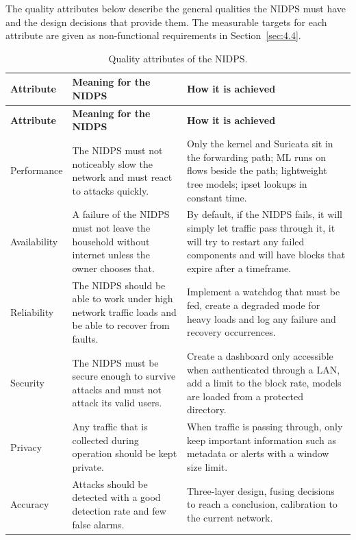 \noindent The quality attributes below describe the general qualities the NIDPS must have and the design decisions that provide them. The measurable targets for each attribute are given as non-functional requirements in Section~\ref{sec:4.4}.

{\small
\begin{longtable}{|>{\raggedright\arraybackslash}p{}|>{\raggedright\arraybackslash}p{}|>{\raggedright\arraybackslash}p{}|}
\caption{Quality attributes of the NIDPS.}\label{tab:4.2}\\
\hline
\textbf{Attribute} & \textbf{Meaning for the NIDPS} & \textbf{How it is achieved} \\ \hline
\endfirsthead
\hline
\textbf{Attribute} & \textbf{Meaning for the NIDPS} & \textbf{How it is achieved} \\ \hline
\endhead
Performance & The NIDPS must not noticeably slow the network and must react to attacks quickly. & Only the kernel and Suricata sit in the forwarding path; ML runs on flows beside the path; lightweight tree models; ipset lookups in constant time. \\ \hline
Availability & A failure of the NIDPS must not leave the household without internet unless the owner chooses that. & By default, if the NIDPS fails, it will simply let traffic pass through it, it will try to restart any failed components and will have blocks that expire after a timeframe. \\ \hline
Reliability & The NIDPS should be able to work under high network traffic loads and be able to recover from faults. & Implement a watchdog that must be fed, create a degraded mode for heavy loads and log any failure and recovery occurrences. \\ \hline
Security & The NIDPS must be secure enough to survive attacks and must not attack its valid users. & Create a dashboard only accessible when authenticated through a LAN, add a limit to the block rate, models are loaded from a protected directory. \\ \hline
Privacy & Any traffic that is collected during operation should be kept private. & When traffic is passing through, only keep important information such as metadata or alerts with a window size limit. \\ \hline
Accuracy & Attacks should be detected with a good detection rate and few false alarms. & Three-layer design, fusing decisions to reach a conclusion, calibration to the current network. \\ \hline

\end{longtable}}
